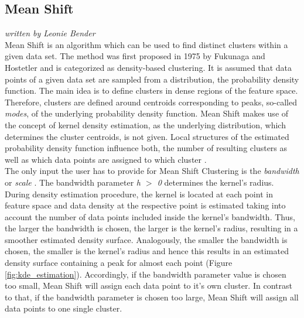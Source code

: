 \subsection{Mean Shift}
\label{sec:Mean Shift}
\textit{written by Leonie Bender}
\\

Mean Shift is an algorithm which can be used to find distinct clusters within a given data set. 
The method was first proposed in 1975 by Fukunaga and Hostetler \cite{fukunaga1975estimation} and is categorized as density-based clustering.
It is assumed that data points of a given data set are sampled from a distribution, the probability density function. The main idea is to define clusters in dense regions of the feature space. Therefore, clusters are defined around centroids corresponding to peaks, so-called \textit{modes}, of the underlying probability density function. Mean Shift makes use of the concept of kernel density estimation, as the underlying distribution, which determines the cluster centroids, is not given. Local structures of the estimated probability density function influence both, the number of resulting clusters as well as which data points are assigned to which cluster \cite{comaniciu2002MeanShift}.  \\
The only input the user has to provide for Mean Shift Clustering is the \textit{bandwidth} or \textit{scale} \cite{scikit-learn}. The bandwidth parameter \textit{h $>$ 0} determines the kernel's radius. During density estimation procedure, the kernel is located at each point in feature space and data density at the respective point is estimated taking into account the number of data points included inside the kernel's bandwidth. Thus, the larger the bandwidth is chosen, the larger is the kernel's radius, resulting in a smoother estimated density surface. Analogously, the smaller the bandwidth is chosen, the smaller is the kernel's radius and hence this results in an estimated density surface containing a peak for almost each point (Figure \ref{fig:kde_estimation}).
Accordingly, if the bandwidth parameter value is chosen too small, Mean Shift will assign each data point to it's own cluster. In contrast to that, if the bandwidth parameter is chosen too large, Mean Shift will assign all data points to one single cluster. 

